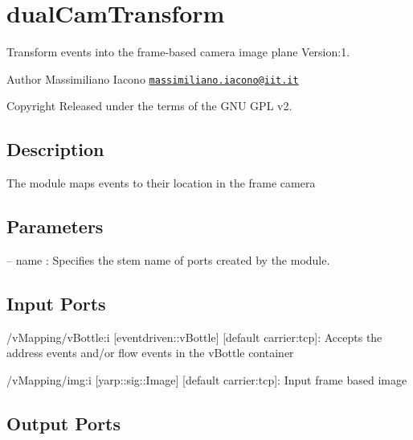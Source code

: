 \hypertarget{group__dualCamTransform}{}\section{dual\+Cam\+Transform}
\label{group__dualCamTransform}
Transform events into the frame-\/based camera image plane Version\+:1. \begin{DoxyAuthor}{Author}
Massimiliano Iacono \href{mailto:massimiliano.iacono@iit.it}{\tt massimiliano.\+iacono@iit.\+it} ~\newline
 
\end{DoxyAuthor}
\begin{DoxyCopyright}{Copyright}
Released under the terms of the G\+NU G\+PL v2. 
\end{DoxyCopyright}
\hypertarget{group__zynqGrabber_intro_sec}{}\subsection{Description}\label{group__zynqGrabber_intro_sec}
The module maps events to their location in the frame camera\hypertarget{group__zynqGrabber_parameters_sec}{}\subsection{Parameters}\label{group__zynqGrabber_parameters_sec}

\begin{DoxyItemize}
\item -- name \+: Specifies the stem name of ports created by the module. 
\end{DoxyItemize}\hypertarget{group__zynqGrabber_inputports_sec}{}\subsection{Input Ports}\label{group__zynqGrabber_inputports_sec}

\begin{DoxyItemize}
\item /v\+Mapping/v\+Bottle\+:i \mbox{[}eventdriven\+::v\+Bottle\mbox{]} \mbox{[}default carrier\+:tcp\mbox{]}\+: Accepts the address events and/or flow events in the v\+Bottle container
\item /v\+Mapping/img\+:i \mbox{[}yarp\+::sig\+::\+Image\mbox{]} \mbox{[}default carrier\+:tcp\mbox{]}\+: Input frame based image
\end{DoxyItemize}\hypertarget{group__zynqGrabber_outputports_sec}{}\subsection{Output Ports}\label{group__zynqGrabber_outputports_sec}

